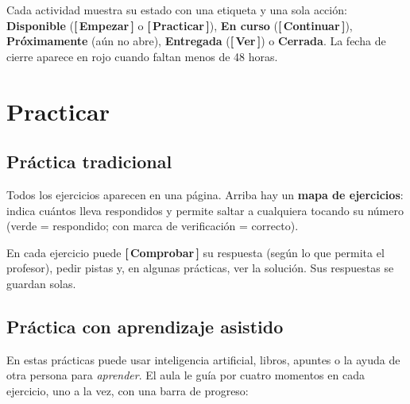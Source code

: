 \documentclass[11pt,a4paper,oneside]{book}
\newcommand{\boton}[1]{\textsf{\textbf{[\,#1\,]}}}
\begin{document}
Cada actividad muestra su estado con una etiqueta y una sola acción:
\textbf{Disponible} (\boton{Empezar} o \boton{Practicar}), \textbf{En curso} (\boton{Continuar}),
\textbf{Próximamente} (aún no abre), \textbf{Entregada} (\boton{Ver}) o \textbf{Cerrada}. La fecha de cierre aparece en
rojo cuando faltan menos de 48 horas.

\chapter{Practicar}

\section{Práctica tradicional}
Todos los ejercicios aparecen en una página. Arriba hay un \textbf{mapa de ejercicios}: indica cuántos lleva
respondidos y permite saltar a cualquiera tocando su número (verde = respondido; con marca de verificación = correcto).

En cada ejercicio puede \boton{Comprobar} su respuesta (según lo que permita el profesor), pedir pistas y, en algunas
prácticas, ver la solución. Sus respuestas se guardan solas.

\section{Práctica con aprendizaje asistido}
En estas prácticas puede usar inteligencia artificial, libros, apuntes o la ayuda de otra persona para
\emph{aprender}. El aula le guía por cuatro momentos en cada ejercicio, uno a la vez, con una barra de progreso:
\end{document}

